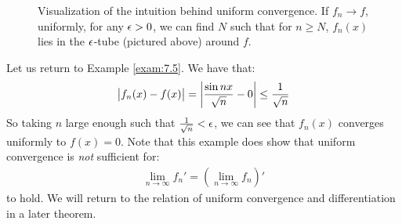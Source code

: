 \begin{figure}[htbp]
    \centering
    
    \caption{Visualization of the intuition behind uniform convergence. If $f_n \rightarrow f$, uniformly, for any $\epsilon > 0$, we can find $N$ such that for $n \geq N$, $f_n(x)$ lies in the $\epsilon$-tube (pictured above) around $f$.}
    \label{fig40}
\end{figure}

\begin{nexample}{}{}
    Let us return to Example \ref{exam:7.5}. We have that:
    \begin{align*}
        \abs{f_n(x) - f(x)} = \abs{\frac{\sin n x}{\sqrt{n}} - 0} \leq \frac{1}{\sqrt{n}}
    \end{align*}
    So taking $n$ large enough such that $\frac{1}{\sqrt{n}} < \epsilon$, we can see that $f_n(x)$ converges uniformly to $f(x) = 0$. Note that this example does show that uniform convergence is \textit{not} sufficient for:
    \begin{align*}
        \lim_{n \rightarrow \infty} f_n' = \left(\lim_{n \rightarrow \infty} f_n \right)'
    \end{align*}
    to hold. We will return to the relation of uniform convergence and differentiation in a later theorem.
\end{nexample}

